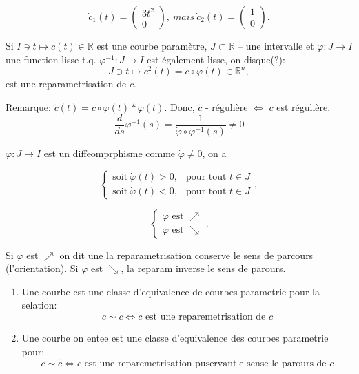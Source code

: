 $$ \dot{c}_1(t) = \left( \begin{array}{c} 3t^2 \\ 0 \end{array} \right),\ mais\ \dot{c}_2(t) = \left( \begin{array}{c} 1 \\ 0 \end{array} \right).$$

\begin{definition} Si $I\ni t \mapsto c(t)\in \mathbb{R}$ est une courbe paramètre, $J\subset \mathbb{R}$ -- une intervalle et $\varphi: J\rightarrow I$ une function lisse t.q. $\varphi^{-1}: J\rightarrow I$ est également lisse, on disque(?):
$$J\ni t \mapsto c^2(t) = c\circ\varphi(t) \in \mathbb{R}^n,$$
est une reparametrisation  de  $c$.
\end{definition}

Remarque:  
$\dot{\tilde{c}}(t)=\dot{c}\circ\varphi(t)*\dot{\varphi}(t)$. Donc,
$\tilde{c}$ - régulière $\Longleftrightarrow$ $c$ est régulière.
$$\frac{d}{ds}\varphi^{-1}(s)=\frac{1}{\dot{\varphi}\circ\varphi^{-1}(s)}\neq 0$$

$\varphi: J\rightarrow I$ est un diffeomprphisme comme $\dot{\varphi}\neq0$, on a

$$\left\{\begin{array}{rl}
\mbox{soit}\ \dot{\varphi}(t)>0, & \mbox{pour tout } t\in J \\ 
\mbox{soit}\ \dot{\varphi}(t)<0, & \mbox{pour tout } t\in J 
\end{array}\right.,$$

$$\left\{\begin{array}{rl}
\varphi\mbox{ est } \nearrow \\ 
\varphi\mbox{ est } \searrow
\end{array}\right..$$

Si $\varphi$ est $\nearrow$ on dit une la reparametrisation conserve le sens de parcours (l'orientation).
Si $\varphi$ est $\searrow$, la reparam inverse le sens de parours.

\begin{definition}
\begin{enumerate}
\item Une courbe est une classe d'equivalence de courbes parametrie pour la selation:
$$c\sim \tilde{c}\Longleftrightarrow\tilde{c}\mbox{ est une reparemetrisation de }c$$
\item Une courbe on entee est une classe d'equivalence des courbes parametrie pour:
$$c\sim \tilde{c}\Longleftrightarrow\tilde{c}\mbox{ est une reparemetrisation puservantle sense le parours de }c$$
\end{enumerate}
\end{definition}

